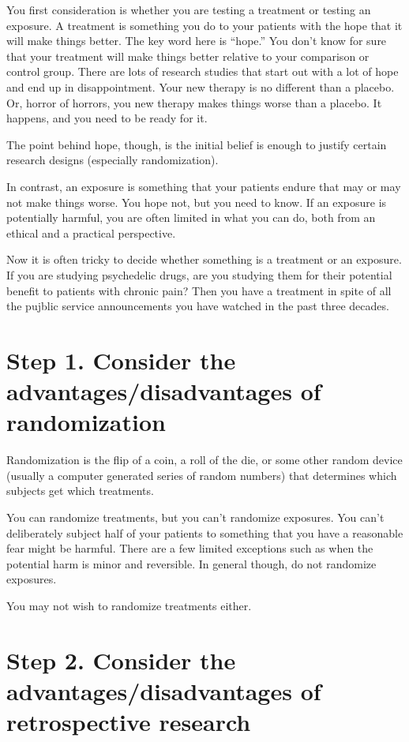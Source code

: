 \documentclass[
  letterpaper,
  DIV=11,
  numbers=noendperiod]{scrreprt}
\begin{document}
You first consideration is whether you are testing a treatment or
testing an exposure. A treatment is something you do to your patients
with the hope that it will make things better. The key word here is
``hope.'' You don't know for sure that your treatment will make things
better relative to your comparison or control group. There are lots of
research studies that start out with a lot of hope and end up in
disappointment. Your new therapy is no different than a placebo. Or,
horror of horrors, you new therapy makes things worse than a placebo. It
happens, and you need to be ready for it.

The point behind hope, though, is the initial belief is enough to
justify certain research designs (especially randomization).

In contrast, an exposure is something that your patients endure that may
or may not make things worse. You hope not, but you need to know. If an
exposure is potentially harmful, you are often limited in what you can
do, both from an ethical and a practical perspective.

Now it is often tricky to decide whether something is a treatment or an
exposure. If you are studying psychedelic drugs, are you studying them
for their potential benefit to patients with chronic pain? Then you have
a treatment in spite of all the pujblic service announcements you have
watched in the past three decades.

\section{Step 1. Consider the advantages/disadvantages of
randomization}\label{step-1.-consider-the-advantagesdisadvantages-of-randomization}

Randomization is the flip of a coin, a roll of the die, or some other
random device (usually a computer generated series of random numbers)
that determines which subjects get which treatments.

You can randomize treatments, but you can't randomize exposures. You
can't deliberately subject half of your patients to something that you
have a reasonable fear might be harmful. There are a few limited
exceptions such as when the potential harm is minor and reversible. In
general though, do not randomize exposures.

You may not wish to randomize treatments either.

\section{Step 2. Consider the advantages/disadvantages of retrospective
research}\label{step-2.-consider-the-advantagesdisadvantages-of-retrospective-research}
\end{document}

